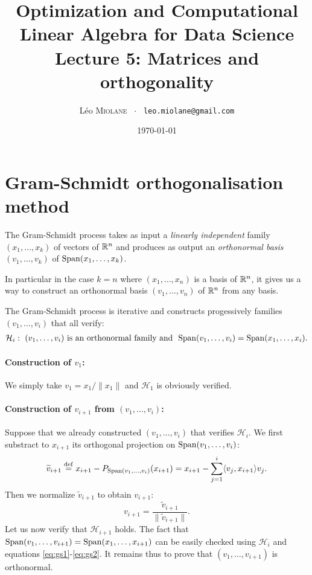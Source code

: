 \documentclass[11pt,nocut]{article}
\title{\vspace{-2.0cm}%
	Optimization and Computational Linear Algebra for Data Science\\
Lecture 5: Matrices and orthogonality}
\author{Léo \textsc{Miolane} \ $\cdot$ \ \texttt{leo.miolane@gmail.com}}
\date{\today}
\begin{document}
\maketitle


\section{Gram-Schmidt orthogonalisation method}\label{sec:gram_schmidt}

The Gram-Schmidt process takes as input a \emph{linearly independent} family $(x_1, \dots, x_k)$ of vectors of $\mathbb{R}^n$ and produces as output an \emph{orthonormal basis} $(v_1, \dots, v_k)$ of ${{\rm Span}}(x_1, \dots, x_k)$.

In particular in the case $k=n$ where $(x_1, \dots, x_n)$ is a basis of $\mathbb{R}^n$, it gives us a way to construct an orthonormal basis $(v_1, \dots ,v_n)$ of $\mathbb{R}^n$ from any basis.

The Gram-Schmidt process is iterative and constructs progessively families $(v_1, \dots, v_i)$ that all verify:
	\begin{align*}
		\mathcal{H}_i: \ (v_1, \dots, v_i) \ \text{is an orthonormal family and} \  \ {{\rm Span}}(v_1, \dots, v_i) = {{\rm Span}}(x_1, \dots, x_i).
\end{align*}

\paragraph{Construction of $v_1$:} We simply take $v_1 = x_1 / \|x_1\|$ and $\mathcal{H}_1$ is obviously verified.

\paragraph{Construction of $v_{i+1}$ from $(v_1, \dots, v_i)$:} 
Suppose that we already constructed $(v_1, \dots, v_i)$ that verifies $\mathcal{H}_i$.
We first substract to $x_{i+1}$ its orthogonal projection on ${{\rm Span}}(v_1, \dots, v_i)$:
\begin{equation}\label{eq:gs1}
\widetilde{v}_{i+1} \overset{\rm def}{=} 
x_{i+1} - P_{{{\rm Span}}(v_1, \dots, v_i)}(x_{i+1}) =
x_{i+1} - \sum_{j=1}^i \langle v_j, x_{i+1} \rangle v_j.
\end{equation}
Then we normalize $\widetilde{v}_{i+1}$ to obtain $v_{i+1}$:
\begin{equation}\label{eq:gs2}
v_{i+1} = \frac{\widetilde{v}_{i+1}}{\| \widetilde{v}_{i+1} \|}.
\end{equation}
Let us now verify that $\mathcal{H}_{i+1}$ holds. 
The fact that ${{\rm Span}}(v_1, \dots, v_{i+1}) = {{\rm Span}}(x_1, \dots, x_{i+1})$ can be easily checked using $\mathcal{H}_i$ and equations \eqref{eq:gs1}-\eqref{eq:gs2}.
It remains thus to prove that $(v_1, \dots, v_{i+1})$ is orthonormal.
\end{document}
